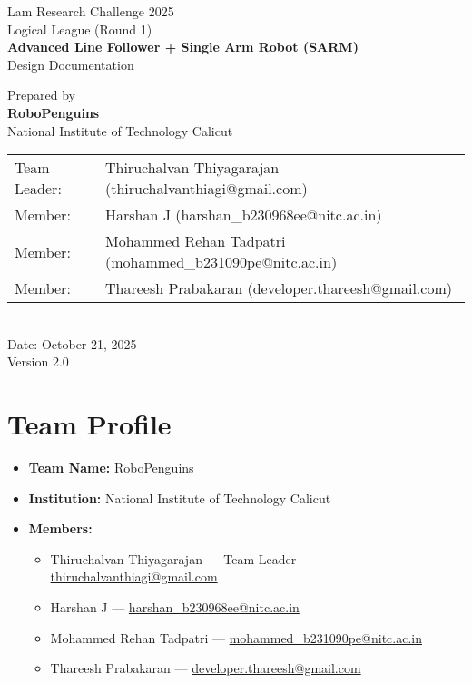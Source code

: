 \documentclass[12pt]{article}
\begin{document}
\begin{titlepage}
    \centering
    {\Large Lam Research Challenge 2025\\[0.5em]Logical League (Round 1)}\\[2em]
    {\Huge \bfseries Advanced Line Follower + Single Arm Robot (SARM)}\\[3em]
    {\Large Design Documentation}\par
    \vfill
    {\large Prepared by}\\[0.5em]
    {\Large \bfseries RoboPenguins}\\[0.25em]
    {National Institute of Technology Calicut}\\[2em]
    \begin{tabular}{ll}
        Team Leader: & Thiruchalvan Thiyagarajan (thiruchalvanthiagi@gmail.com)\\
        Member: & Harshan J (harshan\_b230968ee@nitc.ac.in)\\
        Member: & Mohammed Rehan Tadpatri (mohammed\_b231090pe@nitc.ac.in)\\
        Member: & Thareesh Prabakaran (developer.thareesh@gmail.com)
    \end{tabular}\\[3em]
    {\large Date: October 21, 2025}\\[4em]
    \vfill
    {\small Version 2.0}
\end{titlepage}

\tableofcontents
\clearpage
{}

\section{Team Profile}
\begin{itemize}
    \item \textbf{Team Name:} RoboPenguins
    \item \textbf{Institution:} National Institute of Technology Calicut
    \item \textbf{Members:}
    \begin{itemize}
        \item Thiruchalvan Thiyagarajan --- Team Leader --- \href{mailto:thiruchalvanthiagi@gmail.com}{thiruchalvanthiagi@gmail.com}
        \item Harshan J --- \href{mailto:harshan_b230968ee@nitc.ac.in}{harshan\_b230968ee@nitc.ac.in}
        \item Mohammed Rehan Tadpatri --- \href{mailto:mohammed_b231090pe@nitc.ac.in}{mohammed\_b231090pe@nitc.ac.in}
        \item Thareesh Prabakaran --- \href{mailto:developer.thareesh@gmail.com}{developer.thareesh@gmail.com}
    \end{itemize}
\end{itemize}
\end{document}

